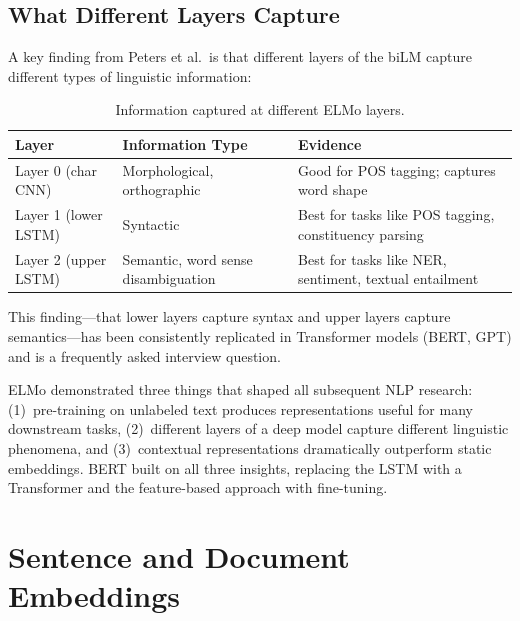 \subsection{What Different Layers Capture}

A key finding from Peters et al.\ is that different layers of the biLM
capture different types of linguistic information:

\begin{table}[H]
\centering
\caption{Information captured at different ELMo layers.}
\label{tab:elmo_layers}
\begin{tabularx}{\textwidth}{l X X}
\toprule
\textbf{Layer} & \textbf{Information Type} & \textbf{Evidence} \\
\midrule
Layer 0 (char CNN) & Morphological, orthographic &
    Good for POS tagging; captures word shape \\
Layer 1 (lower LSTM) & Syntactic &
    Best for tasks like POS tagging, constituency parsing \\
Layer 2 (upper LSTM) & Semantic, word sense disambiguation &
    Best for tasks like NER, sentiment, textual entailment \\
\bottomrule
\end{tabularx}
\end{table}

This finding---that lower layers capture syntax and upper layers capture
semantics---has been consistently replicated in Transformer models (BERT,
GPT) and is a frequently asked interview question.

\begin{keyinsight}
ELMo demonstrated three things that shaped all subsequent NLP research:
(1)~pre-training on unlabeled text produces representations useful for many
downstream tasks, (2)~different layers of a deep model capture different
linguistic phenomena, and (3)~contextual representations dramatically
outperform static embeddings.  BERT built on all three insights, replacing
the LSTM with a Transformer and the feature-based approach with fine-tuning.
\end{keyinsight}


\section{Sentence and Document Embeddings}
\label{sec:sentence_embeddings}


